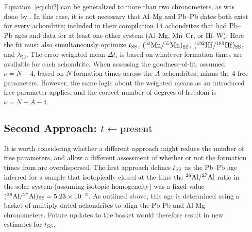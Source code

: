 Equation~\ref{eq:chi2} can be generalized to more than two
chronometers, as was done by \citet{desch2023b}.  In this case, it is
not necessary that Al--Mg and Pb--Pb dates both exist for every
achondrite; \citet{desch2023b} included in their compilation 14
achondrites that had Pb--Pb ages and data for at least one other
system (Al--Mg, Mn--Cr, or Hf--W).  Here the fit must also
simultaneously optimize $\mbox{$t_{\rm SS}$}$, $({}^{53}{\rm Mn}/{}^{55}{\rm
  Mn})_{\rm SS}$, $({}^{182}{\rm Hf}/{}^{180}{\rm Hf})_{\rm SS}$, and
$\lambda_{53}$.  The error-weighted mean $\Delta t_{i}$ is based on
whatever formation times are available for each achondrite.  When
assessing the goodness-of-fit, \citet{desch2023b} assumed $\nu = N-4$,
based on $N$ formation times across the $A$ achondrites, minus the 4
free parameters.  However, the same logic about the weighted means as
an introduced free parameter applies, and the correct number of
degrees of freedom is $\nu = N-A-4$.

\subsection{Second Approach: $t \leftarrow \mbox{present}$}
\label{sec:regression}

It is worth considering whether a different approach might reduce the
number of free parameters, and allow a different assessment of whether
or not the formation times from \citet{desch2023b} are overdispersed.
The first approach defines $\mbox{$t_{\rm SS}$}$ as the Pb--Pb age inferred for a
sample that isotopically closed at the time the $\mbox{${}^{26}{\rm Al}/{}^{27}{\rm Al}$}$ ratio in
the solar system (assuming isotopic homogeneity) was a fixed value
$(\mbox{${}^{26}{\rm Al}/{}^{27}{\rm Al}$})_{\rm SS} = 5.23 \times 10^{-5}$.  As outlined above, this
age is determined using a basket of multiply-dated achondrites to
align the Pb-Pb and Al-Mg chronometers.  Future updates to the basket
would therefore result in new estimates for $\mbox{$t_{\rm SS}$}$.\medskip


